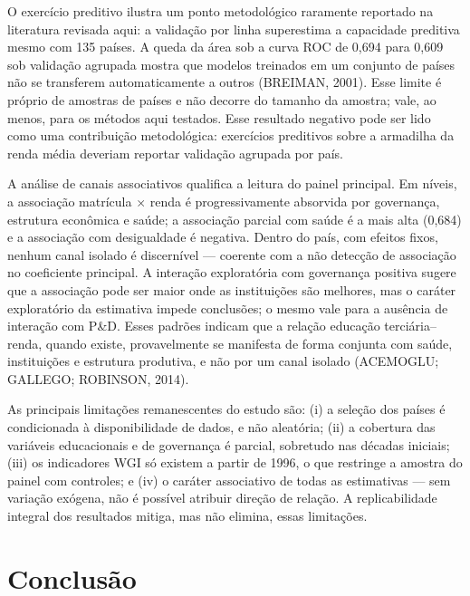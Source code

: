\documentclass[12pt,a4paper]{article}
\begin{document}
O exercício preditivo ilustra um ponto metodológico raramente reportado na literatura revisada aqui: a validação por linha superestima a capacidade preditiva mesmo com 135 países. A queda da área sob a curva ROC de 0,694 para 0,609 sob validação agrupada mostra que modelos treinados em um conjunto de países não se transferem automaticamente a outros (BREIMAN, 2001). Esse limite é próprio de amostras de países e não decorre do tamanho da amostra; vale, ao menos, para os métodos aqui testados. Esse resultado negativo pode ser lido como uma contribuição metodológica: exercícios preditivos sobre a armadilha da renda média deveriam reportar validação agrupada por país.

A análise de canais associativos qualifica a leitura do painel principal. Em níveis, a associação matrícula $\times$ renda é progressivamente absorvida por governança, estrutura econômica e saúde; a associação parcial com saúde é a mais alta (0,684) e a associação com desigualdade é negativa. Dentro do país, com efeitos fixos, nenhum canal isolado é discernível --- coerente com a não detecção de associação no coeficiente principal. A interação exploratória com governança positiva sugere que a associação pode ser maior onde as instituições são melhores, mas o caráter exploratório da estimativa impede conclusões; o mesmo vale para a ausência de interação com P\&D. Esses padrões indicam que a relação educação terciária--renda, quando existe, provavelmente se manifesta de forma conjunta com saúde, instituições e estrutura produtiva, e não por um canal isolado (ACEMOGLU; GALLEGO; ROBINSON, 2014).

As principais limitações remanescentes do estudo são: (i) a seleção dos países é condicionada à disponibilidade de dados, e não aleatória; (ii) a cobertura das variáveis educacionais e de governança é parcial, sobretudo nas décadas iniciais; (iii) os indicadores WGI só existem a partir de 1996, o que restringe a amostra do painel com controles; e (iv) o caráter associativo de todas as estimativas --- sem variação exógena, não é possível atribuir direção de relação. A replicabilidade integral dos resultados mitiga, mas não elimina, essas limitações.

\section{Conclusão}
\end{document}
